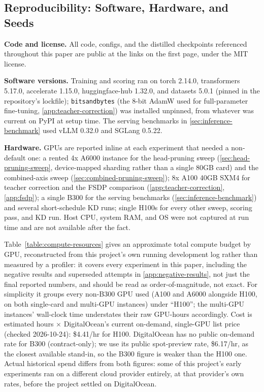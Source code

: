 \documentclass{article}
\theoremstyle{plain}
\theoremstyle{definition}
\theoremstyle{remark}
\begin{document}
\subsection{Reproducibility: Software, Hardware, and Seeds}
\label{app:reproducibility}

\textbf{Code and license.} All code, configs, and the distilled
checkpoints referenced throughout this paper are public at the links on
the first page, under the MIT license.

\textbf{Software versions.} Training and scoring ran on torch 2.14.0,
transformers 5.17.0, accelerate 1.15.0, huggingface-hub 1.32.0, and
datasets 5.0.1 (pinned in the repository's lockfile); \texttt{bitsandbytes}
(the 8-bit AdamW used for full-parameter fine-tuning,
\cref{app:teacher-correction}) was installed unpinned, from whatever was
current on PyPI at setup time. The serving benchmarks in
\cref{sec:inference-benchmark} used vLLM 0.32.0 and SGLang 0.5.22.

\textbf{Hardware.} GPUs are reported inline at each experiment that needed
a non-default one: a rented 4x A6000 instance for the head-pruning sweep
(\cref{sec:head-pruning-sweep}, device-mapped sharding rather than a single
80GB card) and the combined-axis sweep (\cref{sec:combined-pruning-sweep});
8x A100 40GB SXM4 for teacher correction and the FSDP comparison
(\cref{app:teacher-correction}, \cref{app:fsdp}); a single B300 for the serving
benchmarks (\cref{sec:inference-benchmark}) and several short-schedule KD
runs; single H100s for every other sweep, scoring pass, and KD run. Host
CPU, system RAM, and OS were not captured at run time and are not
available after the fact.

Table~\ref{table:compute-resources} gives an approximate total compute
budget by GPU, reconstructed from this project's own running development
log rather than measured by a profiler: it covers every experiment in
this paper, including the negative results and superseded attempts in
\cref{app:negative-results}, not just the final reported numbers, and
should be read as order-of-magnitude, not exact. For simplicity it groups
every non-B300 GPU used (A100 and A6000 alongside H100, on both
single-card and multi-GPU instances) under ``H100''; the multi-GPU
instances' wall-clock time understates their raw GPU-hours accordingly.
Cost is estimated hours $\times$ DigitalOcean's current on-demand,
single-GPU list price (checked 2026-10-24): \$4.41/hr for H100. DigitalOcean
has no public on-demand rate for B300 (contract-only); we use its public
spot-preview rate, \$6.17/hr, as the closest available stand-in, so the
B300 figure is weaker than the H100 one. Actual historical spend differs
from both figures: some of this project's early experiments ran on a
different cloud provider entirely, at that provider's own rates, before
the project settled on DigitalOcean.
\end{document}

